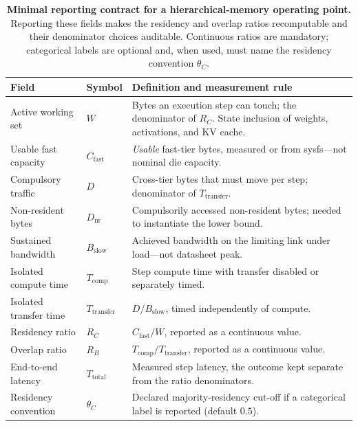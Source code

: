 \begin{table}[t]
\centering
\caption{\textbf{Minimal reporting contract for a hierarchical-memory operating
point.} Reporting these fields makes the residency and overlap ratios
recomputable and their denominator choices auditable. Continuous ratios are
mandatory; categorical labels are optional and, when used, must name the
residency convention $\theta_C$.}
\label{tab:contract}
\begin{tabularx}{\linewidth}{llX}
\toprule
Field & Symbol & Definition and measurement rule\\
\midrule
Active working set & $W$ & Bytes an execution step can touch; the denominator
of $R_C$. State inclusion of weights, activations, and KV cache.\\
Usable fast capacity & $C_{\mathrm{fast}}$ & \emph{Usable} fast-tier bytes,
measured or from sysfs---not nominal die capacity.\\
Compulsory traffic & $D$ & Cross-tier bytes that must move per step;
denominator of $T_{\mathrm{transfer}}$.\\
Non-resident bytes & $D_{\mathrm{nr}}$ & Compulsorily accessed non-resident
bytes; needed to instantiate the lower bound.\\
Sustained bandwidth & $B_{\mathrm{slow}}$ & Achieved bandwidth on the limiting
link under load---not datasheet peak.\\
Isolated compute time & $T_{\mathrm{comp}}$ & Step compute time with transfer
disabled or separately timed.\\
Isolated transfer time & $T_{\mathrm{transfer}}$ & $D/B_{\mathrm{slow}}$, timed
independently of compute.\\
Residency ratio & $R_C$ & $C_{\mathrm{fast}}/W$, reported as a continuous
value.\\
Overlap ratio & $R_B$ & $T_{\mathrm{comp}}/T_{\mathrm{transfer}}$, reported as a
continuous value.\\
End-to-end latency & $T_{\mathrm{total}}$ & Measured step latency, the outcome
kept separate from the ratio denominators.\\
Residency convention & $\theta_C$ & Declared majority-residency cut-off if a
categorical label is reported (default $0.5$).\\
\bottomrule
\end{tabularx}
\end{table}

